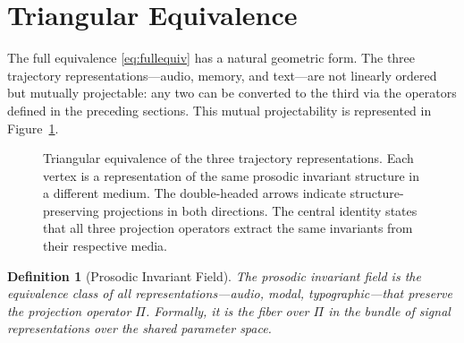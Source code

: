 \documentclass[12pt, a4paper]{article}
\newtheorem{definition}{Definition}
\begin{document}
\section{Triangular Equivalence}

The full equivalence \eqref{eq:fullequiv} has a natural geometric form. The three trajectory representations---audio, memory, and text---are not linearly ordered but mutually projectable: any two can be converted to the third via the operators defined in the preceding sections. This mutual projectability is represented in Figure~\ref{fig:triangle}.

\begin{figure}[h]
\centering
{}
\caption{Triangular equivalence of the three trajectory representations. Each vertex is a representation of the same prosodic invariant structure in a different medium. The double-headed arrows indicate structure-preserving projections in both directions. The central identity states that all three projection operators extract the same invariants from their respective media.}
\label{fig:triangle}
\end{figure}

\begin{definition}[Prosodic Invariant Field]
The \emph{prosodic invariant field} is the equivalence class of all representations---audio, modal, typographic---that preserve the projection operator $\Pi$. Formally, it is the fiber over $\Pi$ in the bundle of signal representations over the shared parameter space.
\end{definition}
\end{document}
